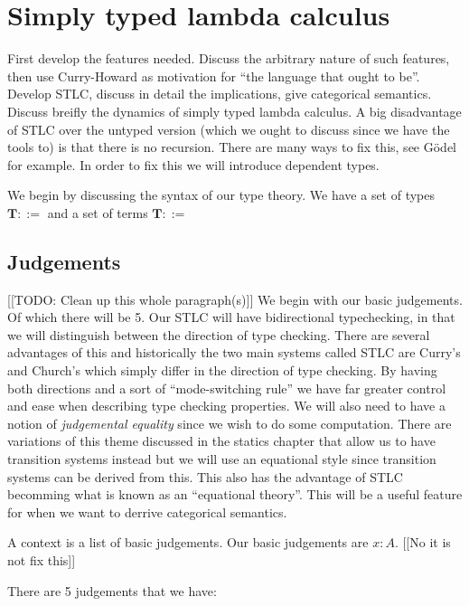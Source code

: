 %
%
\section{Simply typed lambda calculus} 


First develop the features needed. Discuss the arbitrary nature of such features, then use Curry-Howard as motivation for ``the language that ought to be''. Develop STLC, discuss in detail the implications, give categorical semantics. Discuss breifly the dynamics of simply typed lambda calculus. A big disadvantage of STLC over the untyped version (which we ought to discuss since we have the tools to) is that there is no recursion. There are many ways to fix this, see G\"odel for example. In order to fix this we will introduce dependent types.

We begin by discussing the syntax of our type theory. We have a set of types $\mathbf{T}::= $
and a set of terms $\mathbf{T}::=$

\subsection{Judgements}


[[TODO: Clean up this whole paragraph(s)]]
We begin with our basic judgements. Of which there will be 5. Our STLC will have bidirectional typechecking, in that we will distinguish between the direction of type checking. There are several advantages of this and historically the two main systems called STLC are Curry's and Church's which simply differ in the direction of type checking. By having both directions and a sort of ``mode-switching rule'' we have far greater control and ease when describing type checking properties. We will also need to have a notion of \emph{judgemental equality} since we wish to do some computation. There are variations of this theme discussed in the statics chapter that allow us to have transition systems instead but we will use an equational style since transition systems can be derived from this. This also has the advantage of STLC becomming what is known as an ``equational theory''. This will be a useful feature for when we want to derrive categorical semantics. 

A context is a list of basic judgements. Our basic judgements are $x : A$. [[No it is not fix this]]

There are 5 judgements that we have:

